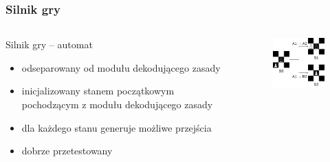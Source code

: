 \documentclass{beamer}
\begin{document}
\begin{frame}
	\frametitle{Silnik gry}
	\begin{columns}
		\begin{column}{.50\textwidth}
			Silnik gry -- automat
			\begin{itemize}
				\item odseparowany od modułu dekodującego zasady
				\item inicjalizowany stanem początkowym pochodzącym z modułu dekodującego zasady
				\item dla każdego stanu generuje możliwe przejścia
				\item dobrze przetestowany
			\end{itemize}
		\end{column}%
		\hfill
		\begin{column}{.50\textwidth}
			\begin{figure}
				\includegraphics[width=4.5cm]{img/stany.png}
				\centering
			\end{figure}
		\end{column}
	\end{columns}
\end{frame}

\end{document}
